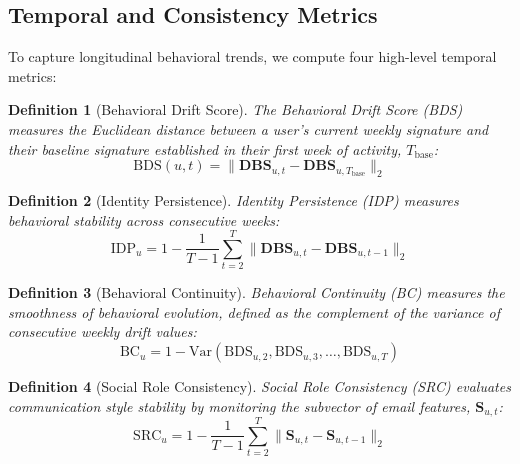 \documentclass[pdflatex,sn-mathphys-num]{sn-jnl}
\theoremstyle{thmstyleone}
\theoremstyle{thmstyletwo}
\theoremstyle{thmstylethree}
\newtheorem{definition}{Definition}
\begin{document}
\subsection{Temporal and Consistency Metrics}\label{subsec3_2}
To capture longitudinal behavioral trends, we compute four high-level temporal metrics:
\begin{definition}[Behavioral Drift Score]
The Behavioral Drift Score (BDS) measures the Euclidean distance between a user's current weekly signature and their baseline signature established in their first week of activity, $T_{\text{base}}$:
\begin{equation}
\text{BDS}(u, t) = \|\mathbf{DBS}_{u,t} - \mathbf{DBS}_{u,T_{\text{base}}}\|_2
\end{equation}
\end{definition}

\begin{definition}[Identity Persistence]
Identity Persistence (IDP) measures behavioral stability across consecutive weeks:
\begin{equation}
\text{IDP}_u = 1 - \frac{1}{T-1} \sum_{t=2}^{T} \|\mathbf{DBS}_{u,t} - \mathbf{DBS}_{u,t-1}\|_2
\end{equation}
\end{definition}

\begin{definition}[Behavioral Continuity]
Behavioral Continuity (BC) measures the smoothness of behavioral evolution, defined as the complement of the variance of consecutive weekly drift values:
\begin{equation}
\text{BC}_u = 1 - \text{Var}\left(\text{BDS}_{u,2}, \text{BDS}_{u,3}, \dots, \text{BDS}_{u,T}\right)
\end{equation}
\end{definition}

\begin{definition}[Social Role Consistency]
Social Role Consistency (SRC) evaluates communication style stability by monitoring the subvector of email features, $\mathbf{S}_{u,t}$:
\begin{equation}
\text{SRC}_u = 1 - \frac{1}{T-1} \sum_{t=2}^{T} \|\mathbf{S}_{u,t} - \mathbf{S}_{u,t-1}\|_2
\end{equation}
\end{definition}
\end{document}
